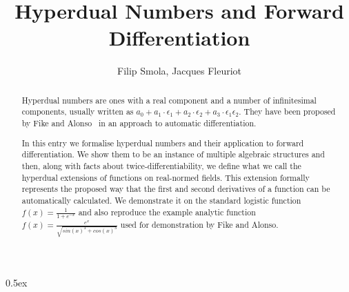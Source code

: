 \documentclass[11pt,a4paper]{article}
\begin{document}
\title{Hyperdual Numbers and Forward Differentiation}
\author{Filip Smola, Jacques Fleuriot}
\maketitle

\begin{abstract}
  Hyperdual numbers are ones with a real component and a number of infinitesimal components, usually written as $a_0 + a_1 \cdot \epsilon_1 + a_2 \cdot \epsilon_2 + a_3 \cdot \epsilon_1\epsilon_2$.
  They have been proposed by Fike and Alonso~\cite{fike_alonso-2011} in an approach to automatic differentiation.

  In this entry we formalise hyperdual numbers and their application to forward differentiation.
  We show them to be an instance of multiple algebraic structures and then, along with facts about twice-differentiability, we define what we call the hyperdual extensions of functions on real-normed fields.
  This extension formally represents the proposed way that the first and second derivatives of a function can be automatically calculated.
  We demonstrate it on the standard logistic function $f(x) = \frac{1}{1 + e^{-x}}$ and also reproduce the example analytic function $f(x) = \frac{e^x}{\sqrt{sin(x)^3 + cos(x)^3}}$ used for demonstration by Fike and Alonso.
\end{abstract}

\tableofcontents

\parindent 0pt\parskip 0.5ex





\end{document}
